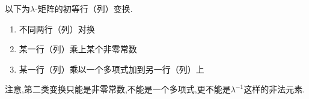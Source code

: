 \begin{formal}
\begin{definition}
    以下为$\lambda$-矩阵的初等行（列）变换.

    \begin{enumerate}[label={\textup{(\arabic*)}}]
        \item 不同两行（列）对换
        \item 某一行（列）乘上某个非零常数
        \item 某一行（列）乘以一个多项式加到另一行（列）上
    \end{enumerate}
\end{definition}
\end{formal}
\begin{red}
\begin{remark}
    注意,第二类变换只能是非零常数,不能是一个多项式,更不能是$\lambda^{-1}$这样的非法元素.
\end{remark}
\end{red}
